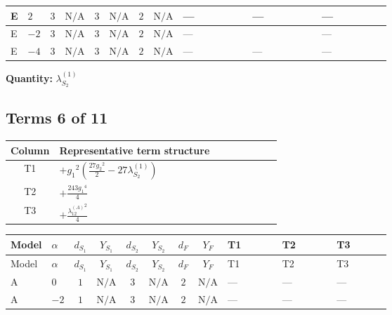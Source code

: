 \documentclass[8pt]{article}
\begin{document}
\begin{landscape}
\begin{longtable}{@{}llcccccc >{\raggedright\arraybackslash}p{0.21\linewidth} >{\raggedright\arraybackslash}p{0.21\linewidth} >{\raggedright\arraybackslash}p{0.21\linewidth}@{}}
\midrule
E & $2$ & $3$ & $\text{N/A}$ & $3$ & $\text{N/A}$ & $2$ & $\text{N/A}$ & --- & --- & --- \\
\midrule
E & $-2$ & $3$ & $\text{N/A}$ & $3$ & $\text{N/A}$ & $2$ & $\text{N/A}$ & --- & \scriptsize\adjustbox{max width=\linewidth}{$\begin{gathered} +\frac{16}{3} {\lambda_{X_{16}}} \left({\lambda_{X_{16}}}\right)^{*}\end{gathered}$} & --- \\
\midrule
E & $-4$ & $3$ & $\text{N/A}$ & $3$ & $\text{N/A}$ & $2$ & $\text{N/A}$ & --- & --- & --- \\
\midrule
\bottomrule
\end{longtable}
\clearpage
\noindent\textbf{Quantity: }$\lambda_{S_2}^{(1)}$\par\smallskip
\subsection*{Terms 6 of 11}
\begin{center}
\begin{tabular}{@{}c >{\raggedright\arraybackslash}p{0.82\linewidth}@{}}
\toprule
Column & Representative term structure \\
\midrule
T1 & \(\displaystyle +{g_1}^2 \left(\frac{27 {g_2}^2}{2}-27 {\lambda_{S_2}^{(1)}}\right)\) \\
\midrule
T2 & \(\displaystyle +\frac{243 {g_1}^4}{4}\) \\
\midrule
T3 & \(\displaystyle +\frac{{\lambda_{12}^{(A)}}^2}{4}\) \\
\midrule
\bottomrule
\end{tabular}
\end{center}
\smallskip
\tiny
\begin{longtable}{@{}llcccccc >{\raggedright\arraybackslash}p{0.21\linewidth} >{\raggedright\arraybackslash}p{0.21\linewidth} >{\raggedright\arraybackslash}p{0.21\linewidth}@{}}
\toprule
Model & $\alpha$ & $d_{S_1}$ & $Y_{S_1}$ & $d_{S_2}$ & $Y_{S_2}$ & $d_F$ & $Y_F$ & T1 & T2 & T3 \\
\midrule
\endfirsthead
\toprule
Model & $\alpha$ & $d_{S_1}$ & $Y_{S_1}$ & $d_{S_2}$ & $Y_{S_2}$ & $d_F$ & $Y_F$ & T1 & T2 & T3 \\
\midrule
\endhead
A & $0$ & $1$ & $\text{N/A}$ & $3$ & $\text{N/A}$ & $2$ & $\text{N/A}$ & --- & --- & --- \\
\midrule
A & $-2$ & $1$ & $\text{N/A}$ & $3$ & $\text{N/A}$ & $2$ & $\text{N/A}$ & --- & --- & --- \\

\end{longtable}
\end{landscape}
\end{document}
